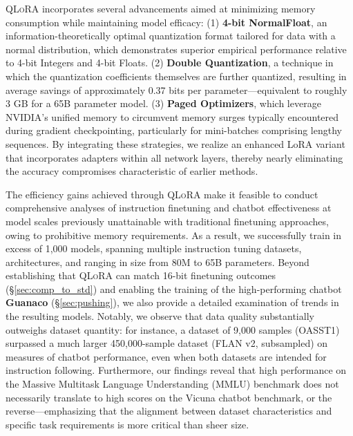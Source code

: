 \textsc{QLoRA} incorporates several advancements aimed at minimizing memory consumption while maintaining model efficacy: (1) \textbf{4-bit NormalFloat}, an information-theoretically optimal quantization format tailored for data with a normal distribution, which demonstrates superior empirical performance relative to 4-bit Integers and 4-bit Floats. (2) \textbf{Double Quantization}, a technique in which the quantization coefficients themselves are further quantized, resulting in average savings of approximately 0.37 bits per parameter—equivalent to roughly 3 GB for a 65B parameter model. (3) \textbf{Paged Optimizers}, which leverage NVIDIA's unified memory to circumvent memory surges typically encountered during gradient checkpointing, particularly for mini-batches comprising lengthy sequences. By integrating these strategies, we realize an enhanced LoRA variant that incorporates adapters within all network layers, thereby nearly eliminating the accuracy compromises characteristic of earlier methods.

The efficiency gains achieved through \textsc{QLoRA} make it feasible to conduct comprehensive analyses of instruction finetuning and chatbot effectiveness at model scales previously unattainable with traditional finetuning approaches, owing to prohibitive memory requirements. As a result, we successfully train in excess of 1,000 models, spanning multiple instruction tuning datasets, architectures, and ranging in size from 80M to 65B parameters. Beyond establishing that \textsc{QLoRA} can match 16-bit finetuning outcomes (\S\ref{sec:comp_to_std}) and enabling the training of the high-performing chatbot \textbf{Guanaco} (\S\ref{sec:pushing}), we also provide a detailed examination of trends in the resulting models. Notably, we observe that data quality substantially outweighs dataset quantity: for instance, a dataset of 9,000 samples (OASST1) surpassed a much larger 450,000-sample dataset (FLAN v2, subsampled) on measures of chatbot performance, even when both datasets are intended for instruction following. Furthermore, our findings reveal that high performance on the Massive Multitask Language Understanding (MMLU) benchmark does not necessarily translate to high scores on the Vicuna chatbot benchmark, or the reverse—emphasizing that the alignment between dataset characteristics and specific task requirements is more critical than sheer size.

